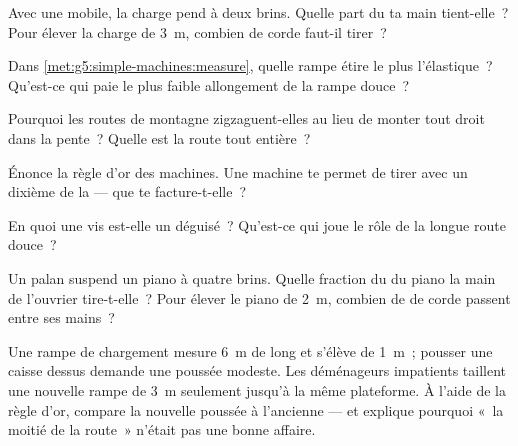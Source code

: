 \begin{exercise}[$\star$]\label{exo:g5:simple-machines:4}
Avec une  mobile, la charge pend à deux brins. Quelle part du
 ta main tient-elle~? Pour élever la charge de \qty{3}{m},
combien de corde faut-il tirer~?
\end{exercise}

\begin{exercise}[$\star$]\label{exo:g5:simple-machines:5}
Dans \cref{met:g5:simple-machines:measure}, quelle rampe étire le
plus l'élastique~? Qu'est-ce qui paie le plus faible allongement de
la rampe douce~?
\end{exercise}

\begin{exercise}[$\star$]\label{exo:g5:simple-machines:6}
Pourquoi les routes de montagne zigzaguent-elles au lieu de monter
tout droit dans la pente~? Quelle  est la route tout
entière~?
\end{exercise}

\begin{exercise}[$\star$]\label{exo:g5:simple-machines:7}
Énonce la règle d'or des machines. Une machine te permet de tirer
avec un dixième de la  --- que te facture-t-elle~?
\end{exercise}

\begin{exercise}[$\star$]\label{exo:g5:simple-machines:8}
En quoi une vis est-elle un  déguisé~? Qu'est-ce qui joue
le rôle de la longue route douce~?
\end{exercise}

\begin{exercise}[$\star\star$]\label{exo:g5:simple-machines:9}
Un palan suspend un piano à quatre brins. Quelle fraction du  du
piano la main de l'ouvrier tire-t-elle~? Pour élever le piano de
\qty{2}{m}, combien de  de corde passent entre ses mains~?
\end{exercise}

\begin{exercise}[$\star\star$]\label{exo:g5:simple-machines:10}
Une rampe de chargement mesure \qty{6}{m} de long et s'élève de
\qty{1}{m}~; pousser une caisse dessus demande une poussée modeste.
Les déménageurs impatients taillent une nouvelle rampe de \qty{3}{m}
seulement jusqu'à la même plateforme. À l'aide de la règle d'or,
compare la nouvelle poussée à l'ancienne --- et explique pourquoi
«~la moitié de la route~» n'était pas une bonne affaire.
\end{exercise}

